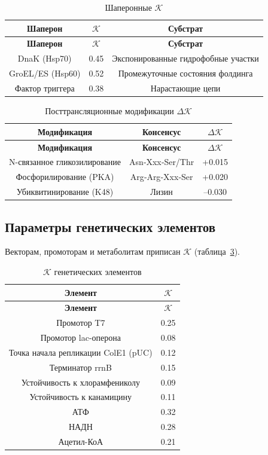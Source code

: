 \documentclass[12pt,a4paper]{article}
\newcommand{\REL}{\mathcal{K}}          %
\begin{document}
	\begin{longtable}{|c|c|c|}
		\caption{Шаперонные \(\REL\)}\label{tab:chaperones}\\
		\hline
		\textbf{Шаперон} & \(\REL\) & \textbf{Субстрат} \\
		\hline
		\endfirsthead
		\hline
		\textbf{Шаперон} & \(\REL\) & \textbf{Субстрат} \\
		\hline
		\endhead
		\hline
		DnaK (Hsp70) & 0.45 & Экспонированные гидрофобные участки \\
		GroEL/ES (Hsp60) & 0.52 & Промежуточные состояния фолдинга \\
		Фактор триггера & 0.38 & Нарастающие цепи \\
		\hline
	\end{longtable}
	
	\begin{longtable}{|c|c|c|}
		\caption{Посттрансляционные модификации \(\Delta \REL\)}\label{tab:ptm}\\
		\hline
		\textbf{Модификация} & \textbf{Консенсус} & \(\Delta \REL\) \\
		\hline
		\endfirsthead
		\hline
		\textbf{Модификация} & \textbf{Консенсус} & \(\Delta \REL\) \\
		\hline
		\endhead
		\hline
		N-связанное гликозилирование & Asn‑Xxx‑Ser/Thr & +0.015 \\
		Фосфорилирование (PKA) & Arg‑Arg‑Xxx‑Ser & +0.020 \\
		Убиквитинирование (K48) & Лизин & –0.030 \\
		\hline
	\end{longtable}
	
	\subsection{Параметры генетических элементов}
	Векторам, промоторам и метаболитам приписан \(\REL\) (таблица~\ref{tab:elements}).
	
	\begin{longtable}{|c|c|}
		\caption{\(\REL\) генетических элементов}\label{tab:elements}\\
		\hline
		\textbf{Элемент} & \(\REL\) \\
		\hline
		\endfirsthead
		\hline
		\textbf{Элемент} & \(\REL\) \\
		\hline
		\endhead
		\hline
		Промотор T7 & 0.25 \\
		Промотор lac-оперона & 0.08 \\
		Точка начала репликации ColE1 (pUC) & 0.12 \\
		Терминатор rrnB & 0.15 \\
		Устойчивость к хлорамфениколу & 0.09 \\
		Устойчивость к канамицину & 0.11 \\
		АТФ & 0.32 \\
		НАДН & 0.28 \\
		Ацетил-КоА & 0.21 \\
		\hline
	\end{longtable}
	
\end{document}

